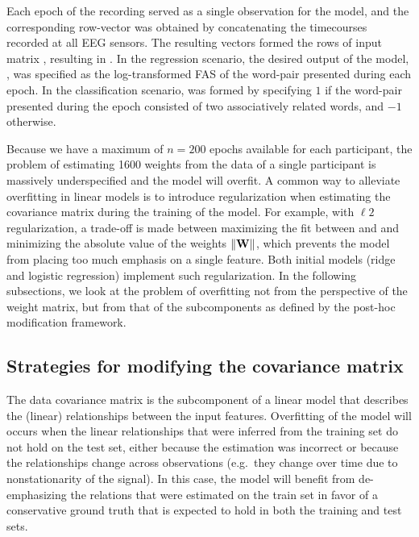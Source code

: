 \documentclass[a4paper]{vanvliet_paper}
\begin{document}
Each epoch of the recording served as a single observation for the model, and the corresponding row-vector  was obtained by concatenating the timecourses recorded at all \gls{EEG} sensors.
The resulting vectors formed the rows of input matrix , resulting in .
In the regression scenario, the desired output of the model, , was specified as the log-transformed \gls{FAS} of the word-pair presented during each epoch\cite{VanVliet2016a}.
In the classification scenario,  was formed by specifying $1$ if the word-pair presented during the epoch consisted of two associatively related words, and $-1$ otherwise.

Because we have a maximum of $n=200$ epochs available for each participant, the problem of estimating 1600 weights from the data of a single participant is massively underspecified and the model will overfit\cite{Babyak2004}.
A common way to alleviate overfitting in linear models is to introduce regularization when estimating the covariance matrix during the training of the model. For example, with $\ell 2$ regularization, a trade-off is made between maximizing the fit between  and  and minimizing the absolute value of the weights $\lVert\mathbf{W}\rVert$, which prevents the model from placing too much emphasis on a single feature\cite{Rifkin2007, Hastie2009}.
Both initial models (ridge and logistic regression) implement such regularization.
In the following subsections, we look at the problem of overfitting not from the perspective of the weight matrix, but from that of the subcomponents as defined by the post-hoc modification framework.

\subsection{Strategies for modifying the covariance matrix}\label{sec:modcov}

The data covariance matrix  is the subcomponent of a linear model that describes the (linear) relationships between the input features.
Overfitting of the model will occurs when the linear relationships that were inferred from the training set do not hold on the test set, either because the estimation was incorrect or because the relationships change across observations (e.g.\ they change over time due to nonstationarity of the signal).
In this case, the model will benefit from de-emphasizing the relations that were estimated on the train set in favor of a conservative ground truth that is expected to hold in both the training and test sets.
\end{document}
